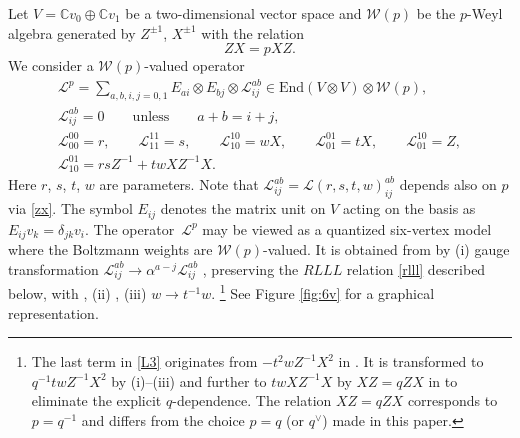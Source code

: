 \documentclass[pdftex]{sigma}
\newcommand{\C}{{\mathbb C}}
\numberwithin{equation}{section}
\begin{document}
Let $V = \C v_0 \oplus \C v_1$ be a two-dimensional vector space and
$\mathcal{W}(p)$ be the $p$-Weyl algebra generated by
$Z^{\pm 1}$, $X^{\pm 1}$ with the relation
\begin{equation}\label{zx}
 ZX = pXZ.
\end{equation}
We consider a $\mathcal{W}(p)$-valued operator
\begin{gather}%
\mathscr{L}^p = \sum_{a,b,i,j=0,1} E_{ai}\otimes E_{bj} \otimes \mathscr{L}^{ab}_{ij}
\in \mathrm{End}(V \otimes V) \otimes \mathcal{W}(p),
\nonumber
\\
\mathscr{L}^{ab}_{ij}=0\qquad \text{unless}\qquad a+b=i+j,
\label{L2}
\\
\mathscr{L}^{00}_{00} = r,\qquad \mathscr{L}^{11}_{11} = s,\qquad \mathscr{L}^{10}_{10} = w X,\qquad
\mathscr{L}^{01}_{01} = tX,
\qquad \mathscr{L}^{10}_{01} = Z,\nonumber
\\ \mathscr{L}^{01}_{10} = rsZ^{-1}+ tw XZ^{-1}X.
\label{L3}
\end{gather}
Here $r$, $s$, $t$, $w$ are parameters. Note that
$\mathscr{L}^{ab}_{ij}=\mathscr{L}(r,s,t,w)^{ab}_{ij}$ depends also on
$p$ via \eqref{zx}. The symbol $E_{ij}$ denotes the matrix unit on
$V$ acting on the basis as $E_{ij}v_k = \delta_{jk}v_i$. The operator~$\mathscr{L}^p$ may be viewed as a quantized six-vertex model where
the Boltzmann weights are $\mathcal{W}(p)$-valued. It is obtained
from \cite[Figure~1]{KMY23} by (i) gauge transformation
$\mathscr{L}^{ab}_{ij} \rightarrow \alpha^{a-j}\mathscr{L}^{ab}_{ij}$
\cite[Remark~3.23]{K22}, preserving the $RLLL$ relation \eqref{rlll}
described below, with , (ii)
, (iii) $w \rightarrow t^{-1}w$.%
%
\footnote{The last term in \eqref{L3} originates from $-t^2wZ^{-1}X^2$
 in \cite[equation~(15)]{KMY23}.
 It is transformed to $q^{-1}twZ^{-1}X^2$
 by (i)--(iii) and further to $twXZ^{-1}X$ by $XZ=qZX$ in
 \cite[equation~(6)]{KMY23} to eliminate the explicit $q$-dependence. The
 relation $XZ = qZX$ \cite[equation~(15)]{KMY23} corresponds to
 $p = q^{-1}$ and differs from the choice $p = q$ \big(or $q^\vee$\big) made
 in this paper.}
%
See Figure \ref{fig:6v} for a graphical representation.
\end{document}
